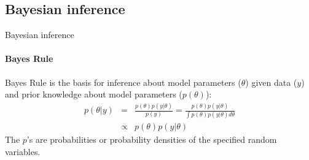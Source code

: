 \documentclass{beamer}
\begin{document}
\subsection{Bayesian inference}

\begin{frame}{Bayesian inference}
\framesubtitle{\large Bayes Rule}

\alert{Bayes Rule} is the basis for inference about model parameters ($\theta$) given data ($y$) and prior knowledge about model parameters ($p\left(\theta\right)$):
\begin{eqnarray*}
p\left(\theta|y\right) &=& \frac{p\left(\theta\right)p\left(y|\theta\right)}{p\left(y\right)}
= \frac{p\left(\theta\right)p\left(y|\theta\right)}{\int{p\left(\theta\right)p\left(y|\theta\right) d\theta}}
\\ 
&\propto& p\left(\theta\right)p\left(y|\theta\right)
\end{eqnarray*}
The $p$'s are probabilities or probability densities of the specified random variables.

\end{frame}

\end{document}

